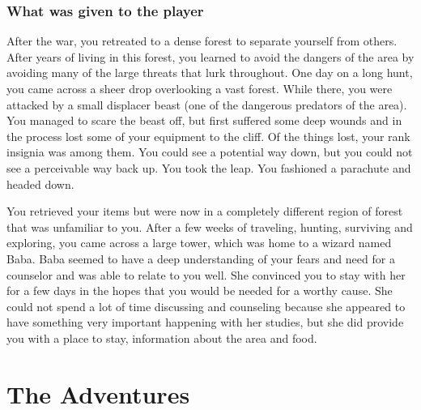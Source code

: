 \subsubsection{What was given to the player}

After the war, you retreated to a dense forest to separate yourself from others. After years of living in this forest, you learned to avoid the dangers of the area by avoiding many of the large threats that lurk throughout. One day on a long hunt, you came across a sheer drop overlooking a vast forest. While there, you were attacked by a small displacer beast (one of the dangerous predators of the area). You managed to scare the beast off, but first suffered some deep wounds and in the process lost some of your equipment to the cliff. Of the things lost, your rank insignia was among them. You could see a potential way down, but you could not see a perceivable way back up. You took the leap. You fashioned a parachute and headed down.

You retrieved your items but were now in a completely different region of forest that was unfamiliar to you. After a few weeks of traveling, hunting, surviving and exploring, you came across a large tower, which was home to a wizard named Baba. Baba seemed to have a deep understanding of your fears and need for a counselor and was able to relate to you well. She convinced you to stay with her for a few days in the hopes that you would be needed for a worthy cause. She could not spend a lot of time discussing and counseling because she appeared to have something very important happening with her studies, but she did provide you with a place to stay, information about the area and food. 

\section{The Adventures}













